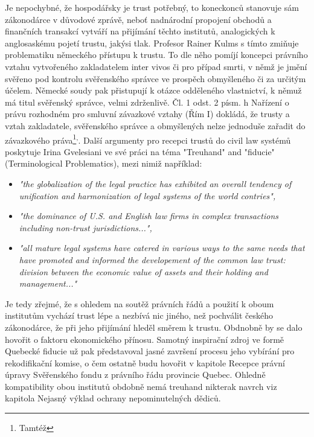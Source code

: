 \documentclass{article}
\begin{document}
 Je nepochybné, že hospodářsky je trust potřebný, to koneckonců stanovuje sám zákonodárce v důvodové zprávě, neboť nadnárodní propojení obchodů a finančních transakcí vytváří na přijímání těchto institutů, analogických k anglosaskému pojetí trustu, jakýsi tlak. Profesor Rainer Kulms s tímto zmiňuje problematiku německého přístupu k trustu. To dle něho pomíjí koncepci právního vztahu vytvořeného zakladatelem inter vivos či pro případ smrti, v němž je jmění svěřeno pod kontrolu svěřenského správce ve prospěch obmyšleného či za určitým účelem. Německé soudy pak přistupují k otázce odděleného vlastnictví, k němuž má titul svěřenský správce, velmi zdrženlivě. Čl. 1 odst. 2 písm. h Nařízení o právu rozhodném pro smluvní závazkové vztahy (Řím I) dokládá, že trusty a vztah zakladatele, svěřenského správce a obmyšlených nelze jednoduše zařadit do závazkového práva\footnote{Tamtéž}\textsuperscript{,}. Další argumenty pro recepci trustů do civil law systémů poskytuje Irina Gvelesiani ve své práci na téma "Treuhand" and "fiducie" (Terminological Problematics), mezi nimiž například:\\
 
 \begin{itemize}
 \item \textit{"the globalization of the legal practice has exhibited an overall tendency of unification and harmonization of legal systems of the world contries",}	
 \item \textit{"the dominance of U.S. and English law firms in complex transactions including non-trust jurisdictions...",}
 \item \textit{"all mature legal systems have catered in various ways to the same needs that have promoted and informed the developement of the common law trust: division between the economic value of assets and their holding and management..."}
 \end{itemize}

Je tedy zřejmé, že s ohledem na soutěž právních řádů a použití k oboum institutům vychází trust lépe a nezbívá nic jiného, než pochválit českého zákonodárce, že při jeho přijímání hleděl směrem k trustu. Obdnobně by se dalo hovořit o faktoru ekonomického přínosu. Samotný inspirační zdroj ve formě Quebecké fiducie už pak představoval jasné završení procesu jeho vybírání pro rekodifikační komise, o čem ostatně budu hovořit v kapitole Recepce právní úpravy Svěřenského fondu z právního řádu provincie Quebec. Ohledně kompatibility obou institutů obdobně nemá treuhand nikterak navrch viz kapitola Nejasný výklad ochrany nepominutelných dědiců.\\
\end{document}
